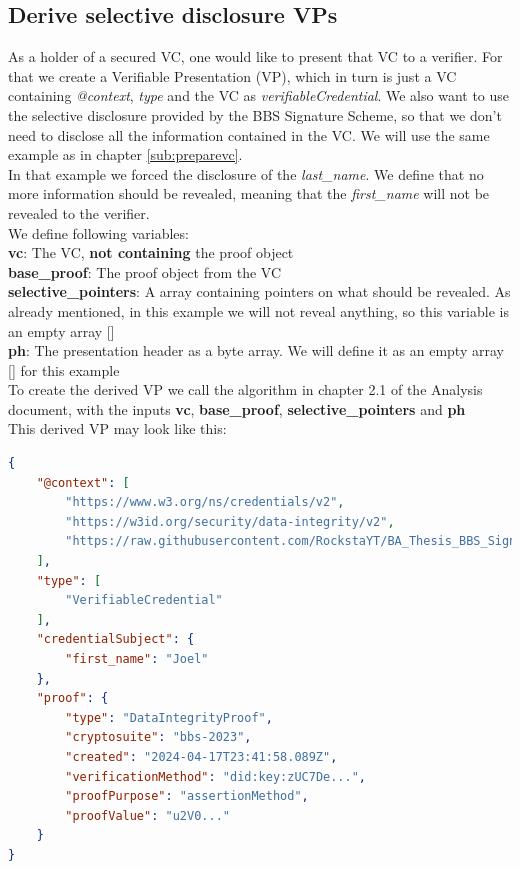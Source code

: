 \documentclass[
	a4paper               %
	,bibliography=totoc   %
	,listof=totoc         %
	,monolingual
	twoside=false,
]{bfhthesis}              %
\begin{document}
\subsection{Derive selective disclosure VPs}
As a holder of a secured VC, one would like to present that VC to a verifier.
For that we create a Verifiable Presentation (VP), which in turn is just a VC containing \textit{@context}, \textit{type} and the VC as \textit{verifiableCredential}.
We also want to use the selective disclosure provided by the BBS Signature Scheme, so that we don't need to disclose all the information contained in the VC.
We will use the same example as in chapter \ref{sub:preparevc}.\\
In that example we forced the disclosure of the \textit{last\_name}. We define that no more information should be revealed, meaning that the \textit{first\_name} will not be revealed to the verifier.\\

We define following variables:\\
\textbf{vc}: The VC, \textbf{not containing} the proof object\\
\textbf{base\_proof}: The proof object from the VC\\
\textbf{selective\_pointers}: A array containing pointers on what should be revealed. As already mentioned, in this example we will not reveal anything, so this variable is an empty array []\\
\textbf{ph}: The presentation header as a byte array. We will define it as an empty array [] for this example\\

To create the derived VP we call the algorithm in chapter 2.1 of the Analysis document, with the inputs \textbf{vc}, \textbf{base\_proof}, \textbf{selective\_pointers} and \textbf{ph}\\

This derived VP may look like this:
\begin{lstlisting}[language=json,firstnumber=1,caption={Derived VP},captionpos=b]
{
	"@context": [
		"https://www.w3.org/ns/credentials/v2",
		"https://w3id.org/security/data-integrity/v2",
		"https://raw.githubusercontent.com/RockstaYT/BA_Thesis_BBS_Signatures/docs/context/example_1.jsonld"
	],
	"type": [
		"VerifiableCredential"
	],
	"credentialSubject": {
		"first_name": "Joel"
	},
	"proof": {
		"type": "DataIntegrityProof",
		"cryptosuite": "bbs-2023",
		"created": "2024-04-17T23:41:58.089Z",
		"verificationMethod": "did:key:zUC7De...",
		"proofPurpose": "assertionMethod",
		"proofValue": "u2V0..."
	}
}
\end{lstlisting}
\end{document}
